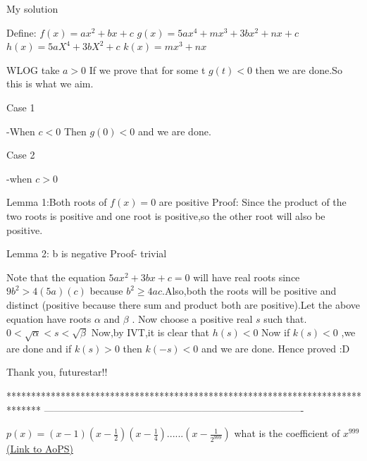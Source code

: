 \begin{solution}
	My solution

Define:
$f(x)=ax^2+bx+c$
$g(x)=5ax^4+mx^3+3bx^2+nx+c$
$h(x)=5aX^4+3bX^2+c$
$k(x)=mx^3+nx $

WLOG take $a>0$
If we prove that for some t $g(t)<0$ then we are done.So this is what we aim.

\begin{bolded}Case 1\end{bolded}-When $c <0$
Then $g(0)<0$ and we are done.

\begin{bolded}Case 2 \end{bolded}-when $c>0$

Lemma 1:Both roots of $f(x)=0$ are positive
Proof: Since the product of the two roots is positive and one root is positive,so the other root will also be positive.

Lemma 2: b is negative
Proof- trivial

Note that the equation $5ax^2+3bx+c=0$ will have real roots since $9b^2 > 4(5a)(c)$ because $b^2 \geq 4ac$.Also,both the roots will be positive and distinct (positive because there sum and product both are positive).Let the above equation have roots $ \alpha$ and $\beta $ .
Now choose a positive real $s$ such that.
$0 < \sqrt \alpha < s < \sqrt \beta $
Now,by IVT,it is clear that $h(s)<0$
Now if $k(s)<0$ ,we are done and if $k(s)>0$
then $k(-s)<0$ and we are done. 
Hence proved :D
\end{solution}



\begin{solution}
	Thank you, futurestar!!
\end{solution}
*******************************************************************************
-------------------------------------------------------------------------------

\begin{problem}
	$p(x)=(x-1)(x-\frac{1}{2})(x-\frac{1}{4})......(x-\frac{1}{2^999})$
what is the coefficient of $x^{999}$
	\flushright \href{https://artofproblemsolving.com/community/c6h1584174}{(Link to AoPS)}
\end{problem}



